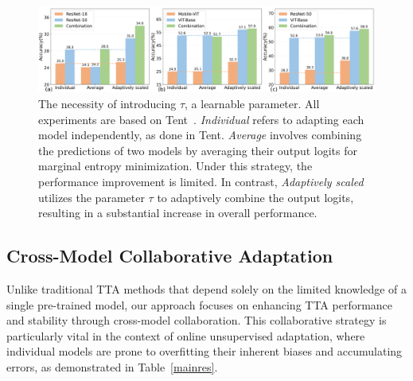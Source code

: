 
\begin{figure}[t]
\centering
    \includegraphics[width=\linewidth]{sec/Tcompare.pdf}
    \vspace{-0.25in}
    \caption{The necessity of introducing $\tau$, a learnable parameter. All experiments are based on Tent~\cite{wang2020tent}. \textit{Individual} refers to adapting each model independently, as done in Tent. \textit{Average} involves combining the predictions of two models by averaging their output logits for marginal entropy minimization. Under this strategy, the performance improvement is limited. In contrast, \textit{Adaptively scaled} utilizes the parameter $\tau$ to adaptively combine the output logits, resulting in a substantial increase in overall performance. }
    \vspace{-0.1in}
\label{Tcompare}
\end{figure}


\subsection{Cross-Model Collaborative Adaptation} 
\label{aoi}
\label{tintro}
Unlike traditional TTA methods that depend solely on the limited knowledge of a single pre-trained model, our approach focuses on enhancing TTA performance and stability through cross-model collaboration. This collaborative strategy is particularly vital in the context of online unsupervised adaptation, where individual models are prone to overfitting their inherent biases and accumulating errors, as demonstrated in Table~\ref{mainres}. 

